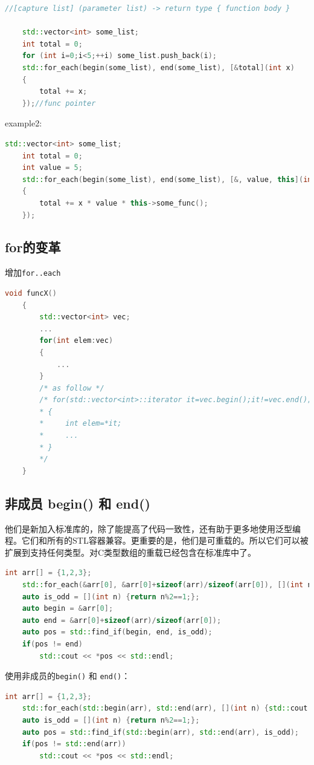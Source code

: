 \documentclass[UTF8,a4paper,12pt]{ctexbook} %
\begin{document}
			\begin{lstlisting}[language=C++]
	//[capture list] (parameter list) -> return type { function body }
	
	std::vector<int> some_list;
	int total = 0;
	for (int i=0;i<5;++i) some_list.push_back(i);
	std::for_each(begin(some_list), end(some_list), [&total](int x) 
	{
		total += x;
	});//func pointer				
			\end{lstlisting}	
			
			example2:
			
			\begin{lstlisting}[language=C++]
	std::vector<int> some_list;
	int total = 0;
	int value = 5;
	std::for_each(begin(some_list), end(some_list), [&, value, this](int x) 
	{
		total += x * value * this->some_func();
	});			
			\end{lstlisting}
			
		\subsection{for的变革}
			增加\verb|for..each|
			\begin{lstlisting}[language = C++]
	void funcX()
	{
		std::vector<int> vec;
		...
		for(int elem:vec)
		{
			...
		}
		/* as follow */
		/* for(std::vector<int>::iterator it=vec.begin();it!=vec.end();++it)
		* {
		*     int elem=*it;
		*     ...
		* }
		*/
	}		
			\end{lstlisting}
					
		\subsection{非成员 begin() 和 end()}
			他们是新加入标准库的，除了能提高了代码一致性，还有助于更多地使用泛型编程。它们和所有的STL容器兼容。更重要的是，他们是可重载的。所以它们可以被扩展到支持任何类型。对C类型数组的重载已经包含在标准库中了。
				\begin{lstlisting}[language=C++]
	int arr[] = {1,2,3};
	std::for_each(&arr[0], &arr[0]+sizeof(arr)/sizeof(arr[0]), [](int n) {std::cout << n << std::endl;});
	auto is_odd = [](int n) {return n%2==1;};
	auto begin = &arr[0];
	auto end = &arr[0]+sizeof(arr)/sizeof(arr[0]);
	auto pos = std::find_if(begin, end, is_odd);
	if(pos != end)
		std::cout << *pos << std::endl;				
				\end{lstlisting}
				
				使用非成员的\verb|begin()| 和 \verb|end()|：
				
				\begin{lstlisting}[language=C++]
	int arr[] = {1,2,3};
	std::for_each(std::begin(arr), std::end(arr), [](int n) {std::cout << n << std::endl;});
	auto is_odd = [](int n) {return n%2==1;};
	auto pos = std::find_if(std::begin(arr), std::end(arr), is_odd);
	if(pos != std::end(arr))
		std::cout << *pos << std::endl;				
				\end{lstlisting}
				
\end{document}
